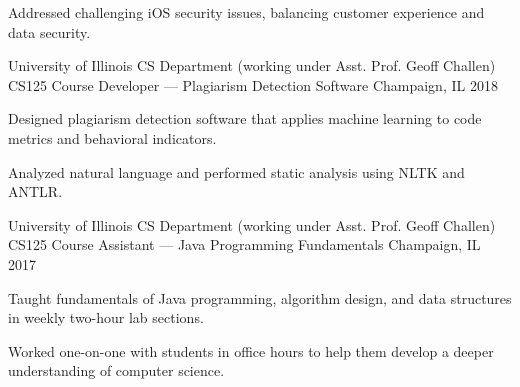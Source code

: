 \begin{cventries}
{\begin{cvitems}
		\item {Addressed challenging iOS security issues, balancing customer experience and data security.}
	\end{cvitems}
}
\cventry
{University of Illinois CS Department (working under Asst. Prof. Geoff Challen)} %
{CS125 Course Developer — Plagiarism Detection Software} %
{Champaign, IL} %
{2018} %
{
	\begin{cvitems} %
		\item {Designed plagiarism detection software that applies machine learning to code metrics and behavioral indicators.}
		\item {Analyzed natural language and performed static analysis using NLTK and ANTLR.}
	\end{cvitems}
}
\cventry
{University of Illinois CS Department (working under Asst. Prof. Geoff Challen)} %
{CS125 Course Assistant — Java Programming Fundamentals} %
{Champaign, IL} %
{2017} %
{
	\begin{cvitems} %
	\item {Taught fundamentals of Java programming, algorithm design, and data structures in weekly two-hour lab sections.}
		\item {Worked one-on-one with students in office hours to help them develop a deeper understanding of computer science.}
	\end{cvitems}
}
\end{cventries}
